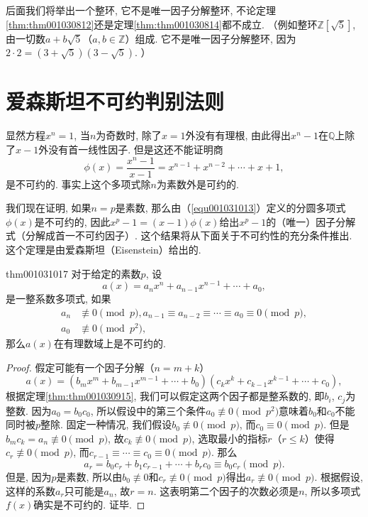后面我们将举出一个整环, 它不是唯一因子分解整环, 不论定理\ref{thm:thm001030812}还是定理\ref{thm:thm001030814}都不成立. （例如整环$\mathbb{Z}[\sqrt{5}]$, 由一切数$a+b\sqrt{5}$（$a,b \in \mathbb{Z}$）组成. 它不是唯一因子分解整环, 因为$2 \cdot 2 = (3+\sqrt{5})(3-\sqrt{5})$. ）



\section{爱森斯坦不可约判别法则}\label{section0010310}
显然方程$x^n=1$, 当$n$为奇数时, 除了$x=1$外没有有理根, 由此得出$x^n-1$在$\mathbb{Q}$上除了$x-1$外没有首一线性因子. 但是这还不能证明商
\begin{equation}\label{equ001031013}
\phi(x)=\frac{x^n-1}{x-1}=x^{n-1}+x^{n-2}+\cdots +x+1,
\end{equation}
是不可约的. 事实上这个多项式除$n$为素数外是可约的. 

我们现在证明, 如果$n=p$是素数, 那么由（\ref{equ001031013}）定义的分圆多项式$\phi(x)$是不可约的, 因此$x^p-1=(x-1)\phi(x)$给出$x^p-1$的（唯一）因子分解式（分解成首一不可约因子）. 这个结果将从下面关于不可约性的充分条件推出. 这个定理是由爱森斯坦（Eisenstein）给出的. 
\begin{theorem}{}{thm001031017}
对于给定的素数$p$, 设
\[
a(x)=a_nx^n+a_{n-1}x^{n-1}+\cdots+a_0,
\]
是一整系数多项式, 如果
\[
\begin{aligned}
a_n &\not\equiv 0 \pmod{p},a_{n-1}\equiv a_{n-2}\equiv \cdots \equiv a_0 \equiv 0 \pmod{p},\\
a_0 &\not\equiv 0 \pmod{p^2},
\end{aligned}
\]
那么$a(x)$在有理数域上是不可约的. 
\end{theorem}

\begin{proof}
假定可能有一个因子分解（$n=m+k$）
\[
a(x)=(b_mx^m+b_{m-1}x^{m-1}+\cdots + b_0)(c_kx^k+c_{k-1}x^{k-1} + \cdots + c_0),
\]
根据定理\ref{thm:thm001030915}, 我们可以假定这两个因子都是整系数的, 即$b_i$, $c_j$为整数. 因为$a_0=b_0c_0$, 所以假设中的第三个条件$a_0 \not\equiv 0 \pmod{p^2}$意味着$b_0$和$c_0$不能同时被$p$整除. 固定一种情况, 我们假设$b_0 \not\equiv 0 \pmod{p}$, 而$c_0 \equiv 0 \pmod{p}$. 但是$b_mc_k = a_n \not\equiv 0 \pmod{p}$, 故$c_k \not\equiv 0 \pmod{p}$, 选取最小的指标$r$（$r \le k$）使得$c_r \not\equiv 0 \pmod{p}$, 而$c_{r-1}\equiv\cdots\equiv c_0 \equiv 0 \pmod{p}$. 那么
\[
a_r = b_0c_r + b_1c_{r-1} + \cdots + b_rc_0 \equiv b_0c_r \pmod{p}.
\]
但是, 因为$p$是素数, 所以由$b_0 \not\equiv 0$和$c_r \not\equiv 0 \pmod{p}$得出$a_r \not\equiv 0 \pmod{p}$. 根据假设, 这样的系数$a_r$只可能是$a_n$, 故$r=n$. 这表明第二个因子的次数必须是$n$, 所以多项式$f(x)$确实是不可约的. 证毕. 
\end{proof}

